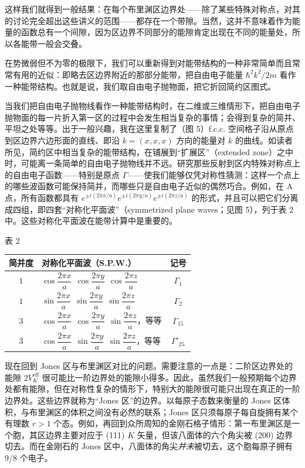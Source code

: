 这样我们就得到一般结果：在每个布里渊区边界处——除了某些特殊对称点，对其的讨论完全超出这些讲义的范围——都存在一个带隙。当然，这并不意味着作为能量的函数总有一个间隙，因为区边界不同部分的能隙肯定出现在不同的能量处，所以各能带一般会交叠。

在势微弱但不为零的极限下，我们可以重新得到对能带结构的一种非常简单而且常常有用的近似：即略去区边界附近的那部分能带，把自由电子能量 $\hbar^2 k^2/2m$ 看作一种能带结构。也就是说，我们取自由电子抛物面，把它折回简约区图式。

当我们把自由电子抛物线看作一种能带结构时，在二维或三维情形下，把自由电子抛物面的每一片折入第一区的过程中会发生相当复杂的事情；会得到复杂的简并、平坦之处等等。出于一般兴趣，我在这里复制了（图 5）f.c.c. 空间格子沿从原点到区边界六边形面的直线、即沿 $k=(x,x,x)$ 方向的能量对 $k$ 的曲线。如读者所见，简约区中相当复杂的能带结构，在铺展到“扩展区”（extended zone）之中时，可能离一条简单的自由电子抛物线并不远。研究那些反射到区内特殊对称点上的自由电子函数——特别是原点 $\Gamma$——使我们能够仅凭对称性猜测：这样一个点上的哪些波函数可能保持简并，而哪些只是自由电子近似的偶然巧合。例如，在 A 点，所有函数都具有 $e^{\pm i(2\pi x/a)}e^{\pm i(2\pi y/a)}e^{\pm i(2\pi z/a)}$ 的形式，并且可以把它们分离成四组，即四套“对称化平面波”（symmetrized plane waves；见图 5），列于表 2 中。这些对称化平面波在能带计算中是重要的。


\begin{center}
表 2

\begin{tabular}{clc}
\toprule
简并度 & 对称化平面波（S.P.W.） & 记号 \\
\midrule
$1$ & $\cos\dfrac{2\pi x}{a}\ \ \cos\dfrac{2\pi y}{a}\ \ \cos\dfrac{2\pi z}{a}$ & $\Gamma_1$ \\[4pt]
$1$ & $\sin\dfrac{2\pi x}{a}\ \ \sin\dfrac{2\pi y}{a}\ \ \sin\dfrac{2\pi z}{a}$ & $\Gamma_2$ \\[4pt]
$3$ & $\cos\dfrac{2\pi x}{a}\ \ \cos\dfrac{2\pi y}{a}\ \ \sin\dfrac{2\pi z}{a}$，等等 & $\Gamma_{15}$ \\[4pt]
$3$ & $\cos\dfrac{2\pi x}{a}\ \ \sin\dfrac{2\pi y}{a}\ \ \sin\dfrac{2\pi z}{a}$，等等 & $\Gamma'_{25}$ \\
\bottomrule
\end{tabular}
\end{center}

现在回到 Jones 区与布里渊区对比的问题。需要注意的一点是：二阶区边界处的能隙 $2V_K^{\mathrm{eff}}$ 很可能比一阶边界处的能隙小得多。因此，虽然我们一般预期每个边界处都有能隙，但在对称性复杂的情形下，特别大的能隙很可能只出现在真正的一阶边界处。这些边界就称为“Jones 区”的边界。以每原子态数来衡量的 Jones 区体积，与布里渊区的体积之间没有必然的联系；Jones 区只须每原子每自旋拥有某个有理数 $r>1$ 个态。例如，再回到众所周知的金刚石格子情形：第一布里渊区是一个胞，其区边界主要对应于 (111) $K$ 矢量，但该八面体的六个角尖被 (200) 边界切去。而在金刚石的 Jones 区中，八面体的角尖\emph{并未}被切去，这个胞每原子拥有 $9/8$ 个电子。

